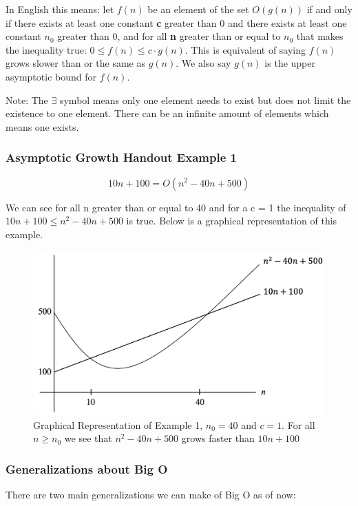 \documentclass{article}
\begin{document}
In English this means: let $f(n)$ be an element of the set $O(g(n))$ if and only if there exists at least one constant \textbf{c} greater than 0 and there exists at least one constant \textbf{$n_0$} greater than 0, and for all \textbf{n} greater than or equal to \textbf{$n_0$} that makes the inequality true: $0 \leq f(n) \leq c \cdot g(n)$. This is equivalent of saying $f(n)$ grows slower than or the same as $g(n)$. We also say $g(n)$ is the upper asymptotic bound for $f(n)$.

Note: The $\exists$ symbol means only one element needs to exist but does not limit the existence to one element. There can be an infinite amount of elements which means one exists.

\subsubsection{Asymptotic Growth Handout Example 1}

$$10n + 100 = O(n^2 - 40n + 500)$$

We can see for all n greater than or equal to 40 and for a c = 1 the inequality of $10n + 100 \leq n^2 - 40n + 500$ is true. Below is a graphical representation of this example.

\begin{figure}[H]
    \centering
    \includegraphics[scale=.4]{Figures/cse102lecture1example1.png}
    \caption{Graphical Representation of Example 1, $n_0 = 40$ and $c = 1$. For all $n \geq n_0$ we see that $n^2 - 40n + 500$ grows faster than $10n + 100$}
    \label{lecture1example1}
\end{figure}

\subsubsection{Generalizations about Big O}
There are two main generalizations we can make of Big O as of now:
\end{document}
